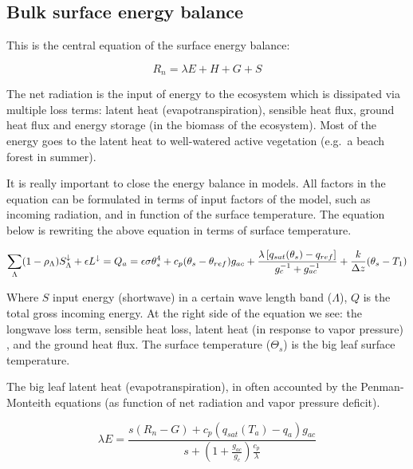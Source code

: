 \documentclass[12pt,oneside]{book}
\begin{document}
\subsection{Bulk surface energy
balance}\label{bulk-surface-energy-balance}

This is the central equation of the surface energy balance:

\[
R_n = \lambda E + H + G +S
\]

The net radiation is the input of energy to the ecosystem which is
dissipated via multiple loss terms: latent heat (evapotranspiration),
sensible heat flux, ground heat flux and energy storage (in the biomass
of the ecosystem). Most of the energy goes to the latent heat to
well-watered active vegetation (e.g.~a beach forest in summer).

It is really important to close the energy balance in models. All
factors in the equation can be formulated in terms of input factors of
the model, such as incoming radiation, and in function of the surface
temperature. The equation below is rewriting the above equation in terms
of surface temperature.

\[
\sum_{\Lambda} (1 - \rho_{\Lambda} ) S^{\downarrow}_{\Lambda} + \epsilon L^{\downarrow} = Q_{a} \\ = \epsilon \sigma \theta_s^{4} + c_p ( \theta_s - \theta_{ref} ) g_{ac} + \frac{\lambda \left[ q_{sat} ( \theta_s ) - q_{ref} \right] }{ g_c^{-1} + g_{ac}^{-1}} + \frac{k}{\Delta z} (\theta_s - T_1)
\]

Where \(S\) input energy (shortwave) in a certain wave length band
(\(\Lambda\)), \(Q\) is the total gross incoming energy. At the right
side of the equation we see: the longwave loss term, sensible heat loss,
latent heat (in response to vapor pressure) , and the ground heat flux.
The surface temperature (\(\Theta_s\)) is the big leaf surface
temperature.

The big leaf latent heat (evapotranspiration), in often accounted by the
Penman-Monteith equations (as function of net radiation and vapor
pressure deficit).

\[
\lambda E = \frac{s (R_n - G) + c_p \left(q_{sat}(T_a) - q_a \right) g_{ac}}{s + (1 + \frac{g_{ac}}{g_c}) \frac{c_p}{\lambda}}
\]
\end{document}
